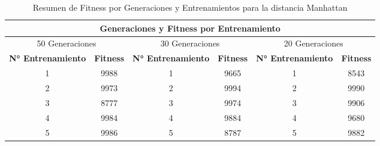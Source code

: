\documentclass[conference]{IEEEtran}
\begin{document}
\begin{table}[ht]
    \centering
    \caption{Resumen de Fitness por Generaciones y Entrenamientos para la distancia Manhattan}
    \label{tab:fitness_generaciones_chebyshev}
    \begin{tabular}{cccccc}
        \toprule
        \multicolumn{6}{c}{Generaciones y Fitness por Entrenamiento} \\
        \midrule
        \multicolumn{2}{c}{50 Generaciones} & \multicolumn{2}{c}{30 Generaciones} & \multicolumn{2}{c}{20 Generaciones} \\
        \cmidrule(lr){1-2} \cmidrule(lr){3-4} \cmidrule(lr){5-6}
        \textbf{N° Entrenamiento} & \textbf{Fitness} & \textbf{N° Entrenamiento} & \textbf{Fitness} & \textbf{N° Entrenamiento} & \textbf{Fitness} \\
        \midrule
        1 & 9988 & 1 & 9665 & 1 & 8543 \\
        2 & 9973 & 2 & 9994 & 2 & 9990 \\
        3 & 8777 & 3 & 9974 & 3 & 9906 \\
        4 & 9984 & 4 & 9884 & 4 & 9680 \\
        5 & 9986 & 5 & 8787 & 5 & 9882 \\
        \bottomrule
    \end{tabular}
\end{table}
\end{document}
